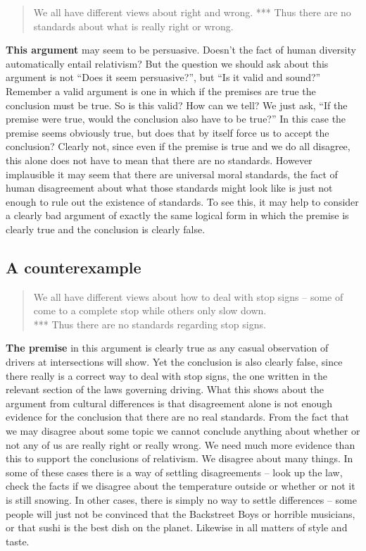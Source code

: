 \documentclass[]{book}
\begin{document}
\begin{quote}
We all have different views about right and wrong. *** Thus there are no standards about what is really right or wrong.
\end{quote}

\textbf{This argument} may seem to be persuasive. Doesn't the fact of human diversity automatically entail relativism? But the question we should ask about this argument is not ``Does it seem persuasive?'', but ``Is it valid and sound?'' Remember a valid argument is one in which if the premises are true the conclusion must be true. So is this valid? How can we tell? We just ask, ``If the premise were true, would the conclusion also have to be true?'' In this case the premise seems obviously true, but does that by itself force us to accept the conclusion? Clearly not, since even if the premise is true and we do all disagree, this alone does not have to mean that there are no standards. However implausible it may seem that there are universal moral standards, the fact of human disagreement about what those standards might look like is just not enough to rule out the existence of standards. To see this, it may help to consider a clearly bad argument of exactly the same logical form in which the premise is clearly true and the conclusion is clearly false.

\hypertarget{a-counterexample}{%
\subsection*{A counterexample}\label{a-counterexample}}


\begin{quote}
We all have different views about how to deal with stop signs -- some of come to a complete stop while others only slow down.\\
*** Thus there are no standards regarding stop signs.
\end{quote}

\textbf{The premise} in this argument is clearly true as any casual observation of drivers at intersections will show. Yet the conclusion is also clearly false, since there really is a correct way to deal with stop signs, the one written in the relevant section of the laws governing driving. What this shows about the argument from cultural differences is that disagreement alone is not enough evidence for the conclusion that there are no real standards. From the fact that we may disagree about some topic we cannot conclude anything about whether or not any of us are really right or really wrong. We need much more evidence than this to support the conclusions of relativism. We disagree about many things. In some of these cases there is a way of settling disagreements -- look up the law, check the facts if we disagree about the temperature outside or whether or not it is still snowing. In other cases, there is simply no way to settle differences -- some people will just not be convinced that the Backstreet Boys or horrible musicians, or that sushi is the best dish on the planet. Likewise in all matters of style and taste.
\end{document}
